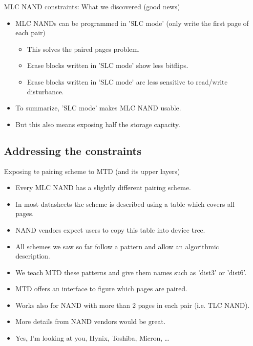 \documentclass[aspectratio=169,obeyspaces,spaces,hyphens,dvipsnames]{beamer}
\begin{document}
\begin{frame}{MLC NAND constraints: What we discovered (good news)}
  \begin{itemize}
  \item MLC NANDs can be programmed in 'SLC mode' (only write the first
	page of each pair)
    \begin{itemize}
    \item This solves the paired pages problem.
    \item Erase blocks written in 'SLC mode' show less bitflips.
    \item Erase blocks written in 'SLC mode' are less sensitive to
	  read/write disturbance.
    \end{itemize}
  \item To summarize, 'SLC mode' makes MLC NAND usable.
  \item But this also means exposing half the storage capacity.
  \end{itemize}
\end{frame}

\subsection{Addressing the constraints}

\begin{frame}{Exposing te pairing scheme to MTD (and its upper layers)}
  \begin{itemize}
  \item Every MLC NAND has a slightly different pairing scheme.
  \item In most datasheets the scheme is described using a table which covers all pages.
  \item NAND vendors expect users to copy this table into device tree.
  \item All schemes we saw so far follow a pattern and allow an algorithmic description.
  \item We teach MTD these patterns and give them names such as 'dist3' or 'dist6'.
  \item MTD offers an interface to figure which pages are paired.
  \item Works also for NAND with more than 2 pages in each pair (i.e. TLC NAND).
  \item More details from NAND vendors would be great.
  \item Yes, I'm looking at you, Hynix, Toshiba, Micron, \ldots
  \end{itemize}
\end{frame}
\end{document}
